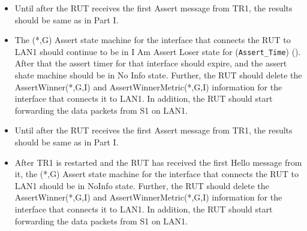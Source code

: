 \documentclass[11pt]{report}
\begin{document}

\begin{itemize}

  \item Until after the RUT receives the first Assert message from TR1, the
  results should be same as in Part I.

  \item The (*,G) Assert state machine for the interface that connects the RUT
  to LAN1 should continue to be in I Am Assert Loser state for
  (\verb=Assert_Time=) ({\PimsmAssertTime}). After that the assert timer for
  that interface should expire, and the assert shate machine should be in No
  Info state.
  Further, the RUT should delete the AssertWinner(*,G,I) and
  AssertWinnerMetric(*,G,I) information for the interface that connects it to
  LAN1.
  In addition, the RUT should start forwarding the data packets from S1 on
  LAN1.

\end{itemize}


\begin{itemize}

  \item Until after the RUT receives the first Assert message from TR1, the
  results should be same as in Part I.

  \item After TR1 is restarted and the RUT has received the first Hello
  message from it, the (*,G) Assert state machine for the
  interface that connects the RUT to LAN1 should be in NoInfo state.
  Further, the RUT should delete the AssertWinner(*,G,I) and
  AssertWinnerMetric(*,G,I) information for the interface that connects it to
  LAN1.
  In addition, the RUT should start forwarding the data packets from S1 on
  LAN1.

\end{itemize}

\end{document}
